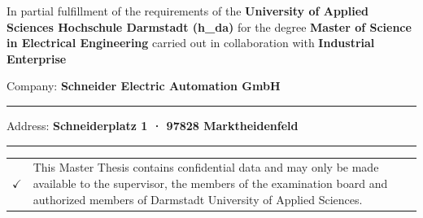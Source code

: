 \noindent
In partial fulfillment of the requirements of the
\textbf{University of Applied Sciences Hochschule Darmstadt (h\_da)}
for the degree \textbf{Master of Science in Electrical Engineering}
carried out in collaboration with \textbf{Industrial Enterprise}

\vspace{3mm}

\noindent
Company: \textbf{Schneider Electric Automation GmbH}

\vspace{-1.0\baselineskip}
\noindent
\rule{\textwidth}{0.4pt}

\vspace{4mm}

\noindent
Address: \textbf{Schneiderplatz 1 · 97828 Marktheidenfeld}

\vspace{-1.0\baselineskip}
\noindent
\rule{\textwidth}{0.4pt}



\noindent
\begin{tabular}{lp{14.5cm}}
	$\checkmark$ &
	This Master Thesis contains confidential data and may only be made
	available to the supervisor, the members of the examination board and
	authorized members of Darmstadt University of Applied Sciences.
\end{tabular}
